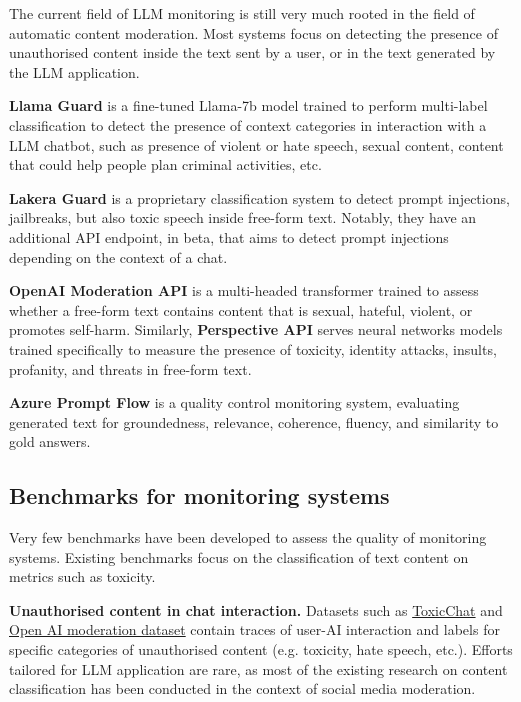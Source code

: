 \documentclass{article}
\begin{document}
The current field of LLM monitoring is still very much rooted in the field
of automatic content moderation. Most systems focus on detecting the
presence of unauthorised content inside the text sent by a user, or in
the text generated by the LLM application.

\textbf{Llama Guard} \cite{Llama-guard} is a fine-tuned Llama-7b model trained to perform
multi-label classification to detect the presence of context categories
in interaction with a LLM chatbot, such as presence of violent or hate speech, sexual content, content that could help people plan criminal activities, etc.

\textbf{Lakera Guard} \cite{lakera-guard} is a proprietary classification system to detect
prompt injections, jailbreaks, but also toxic speech inside free-form text.
Notably, they have an additional API endpoint, in beta, that aims to detect prompt injections depending on the context of a chat.

\textbf{OpenAI Moderation API} \cite{openai-moderation-api-paper} is a multi-headed transformer trained to
assess whether a free-form text contains content that is sexual, hateful, violent, or promotes
self-harm.
Similarly, \textbf{Perspective API} \cite{perspective-api} serves neural networks models
trained specifically to measure the presence of toxicity, identity
attacks, insults, profanity, and threats in free-form text.

\textbf{Azure Prompt Flow} \cite{azure-prompt-flow-docs} is a quality control monitoring system,
evaluating generated text for groundedness, relevance, coherence, fluency, and similarity to gold answers.

\subsection{Benchmarks for monitoring systems}

Very few benchmarks have been developed to assess the quality of
monitoring systems. Existing benchmarks focus on the classification of
text content on metrics such as toxicity.

\textbf{Unauthorised content in chat interaction.} Datasets such as
\href{https://arxiv.org/abs/2310.17389}{ToxicChat} \cite{toxic-chat-dataset} and
\href{https://arxiv.org/abs/2208.03274}{Open AI moderation dataset} \cite{openai-moderation-api-paper}
contain traces of user-AI interaction and labels for specific categories
of unauthorised content (e.g. toxicity, hate speech, etc.). Efforts
tailored for LLM application are rare, as most of the existing research
on content classification has been conducted in the context of social
media moderation.
\end{document}
